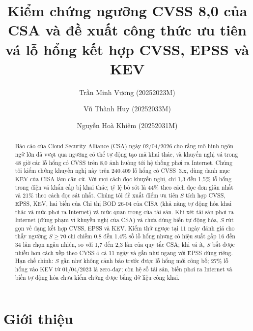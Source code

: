 \documentclass[runningheads]{llncs}
\begin{document}
%
\title{Kiểm chứng ngưỡng CVSS 8,0 của CSA và đề xuất công thức ưu tiên vá lỗ hổng kết hợp CVSS, EPSS và KEV}
%
\author{Trần Minh Vương (20252023M) \and
Vũ Thành Huy (20252033M) \and
Nguyễn Hoà Khiêm (20252031M)}
%
\maketitle
%
\begin{abstract}
Báo cáo của Cloud Security Alliance (CSA) ngày 02/04/2026 cho rằng mô hình ngôn ngữ lớn đã
vượt qua ngưỡng có thể tự động tạo mã khai thác, và khuyến nghị vá trong 48 giờ các lỗ hổng có CVSS trên
8,0 ảnh hưởng tới hệ thống phơi ra Internet. Chúng tôi kiểm chứng khuyến nghị này trên 240.409 lỗ hổng
có CVSS~3.x, dùng danh mục KEV của CISA làm căn cứ. Với mọi cách đọc khuyến nghị, chỉ 1,3 đến 1,5\%
lỗ hổng trong diện vá khẩn cấp bị khai thác; tỷ lệ bỏ sót là 44\% theo cách đọc đơn giản nhất
và 21\% theo cách đọc sát nhất. Chúng tôi đề xuất điểm ưu tiên $S$ tích hợp CVSS, EPSS, KEV, hai biến của Chỉ thị BOD 26-04 của CISA (khả năng tự động hóa khai thác và mức phơi ra Internet) và mức quan trọng của tài sản. Khi xét tài sản phơi ra Internet (đúng phạm vi khuyến nghị của CSA) và chưa dùng biến tự động hóa, $S$ rút gọn về dạng kết hợp CVSS, EPSS và KEV. Kiểm thử ngược
tại 11 ngày đánh giá cho thấy ngưỡng $S \ge 70$ chỉ chiếm 0,8 đến 1,4\% số lỗ hổng nhưng có hiệu
suất gấp 16 đến 34 lần chọn ngẫu nhiên, so với 1,7 đến 2,3 lần của quy tắc CSA; khi vá ít, $S$ bắt được
nhiều hơn cách xếp theo CVSS ở cả 11 ngày và gần như ngang với EPSS dùng riêng. Hạn chế chính: $S$ gần như không
cảnh báo trước được lỗ hổng mới công bố; 27\% lỗ hổng vào KEV từ 01/04/2023 là zero-day; còn hệ số tài sản, biến phơi ra Internet và biến tự động hóa chưa kiểm chứng được bằng dữ liệu công khai.

\end{abstract}
%
\section{Giới thiệu}
\end{document}
